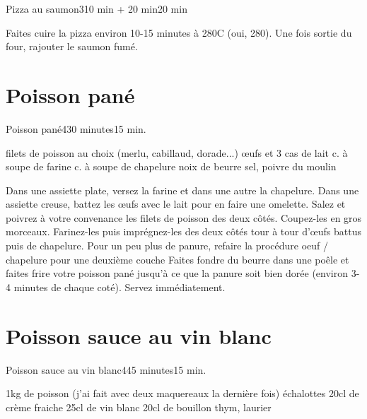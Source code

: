 {\begin{recette}{Pizza au saumon}{3}{10 min + 20 min}{20 min}
\begin{cuisson}
Faites cuire la pizza environ 10-15 minutes à 280\degres C (oui, 280). Une fois sortie du four, rajouter le saumon fumé. 
\end{cuisson}
\end{recette}

\section{Poisson pané}
\begin{recette}{Poisson pané}{4}{30 minutes}{15 min.}
\begin{ingredients}
 filets de poisson au choix (merlu, cabillaud, dorade...)
 œufs et 3 cas de lait
 c. à soupe de farine
 c. à soupe de chapelure
 noix de beurre
\ingredient sel, poivre du moulin
\end{ingredients}

\begin{preparation}
\etape Dans une assiette plate, versez la farine et dans une autre la chapelure. Dans une assiette creuse, battez les œufs avec le lait pour en faire une omelette.
\etape Salez et poivrez à votre convenance les filets de poisson des deux côtés. Coupez-les en gros morceaux. Farinez-les puis imprégnez-les des deux côtés tour à tour d'œufs battus puis de chapelure.
\etape [optionnel] Pour un peu plus de panure, refaire la procédure oeuf / chapelure pour une deuxième couche
\etape Faites fondre du beurre dans une poêle et faites frire votre poisson pané jusqu'à ce que la panure soit bien dorée (environ 3-4 minutes de chaque coté). Servez immédiatement.
\end{preparation}
\end{recette}

\section{Poisson sauce au vin blanc}
\begin{recette}{Poisson sauce au vin blanc}{4}{45 minutes}{15 min.}
\begin{ingredients}
\ingredient 1kg de poisson (j'ai fait avec deux maquereaux la dernière fois)
 échalottes
\ingredient 20cl de crème fraiche
\ingredient 25cl de vin blanc
\ingredient 20cl de bouillon
\ingredient thym, laurier
\end{ingredients}


\end{recette}}
